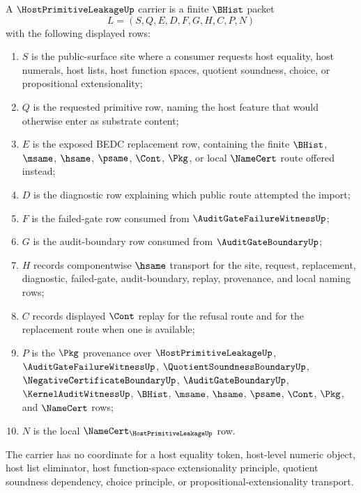 \begin{definition}
\label{def:host-primitive-leakage-carrier}
A $\HostPrimitiveLeakageUp$ carrier is a finite $\BHist$ packet
$$
L=(S,Q,E,D,F,G,H,C,P,N)
$$
with the following displayed rows:
\begin{enumerate}
\item $S$ is the public-surface site where a consumer requests host equality, host numerals, host lists, host function spaces, quotient soundness, choice, or propositional extensionality;
\item $Q$ is the requested primitive row, naming the host feature that would otherwise enter as substrate content;
\item $E$ is the exposed BEDC replacement row, containing the finite $\BHist$, $\msame$, $\hsame$, $\psame$, $\Cont$, $\Pkg$, or local $\NameCert$ route offered instead;
\item $D$ is the diagnostic row explaining which public route attempted the import;
\item $F$ is the failed-gate row consumed from $\AuditGateFailureWitnessUp$;
\item $G$ is the audit-boundary row consumed from $\AuditGateBoundaryUp$;
\item $H$ records componentwise $\hsame$ transport for the site, request, replacement, diagnostic, failed-gate, audit-boundary, replay, provenance, and local naming rows;
\item $C$ records displayed $\Cont$ replay for the refusal route and for the replacement route when one is available;
\item $P$ is the $\Pkg$ provenance over $\HostPrimitiveLeakageUp$, $\AuditGateFailureWitnessUp$, $\QuotientSoundnessBoundaryUp$, $\NegativeCertificateBoundaryUp$, $\AuditGateBoundaryUp$, $\KernelAuditWitnessUp$, $\BHist$, $\msame$, $\hsame$, $\psame$, $\Cont$, $\Pkg$, and $\NameCert$ rows;
\item $N$ is the local $\NameCert_{\HostPrimitiveLeakageUp}$ row.
\end{enumerate}
The carrier has no coordinate for a host equality token, host-level numeric object, host list eliminator, host function-space extensionality principle, quotient soundness dependency, choice principle, or propositional-extensionality transport.
\end{definition}

